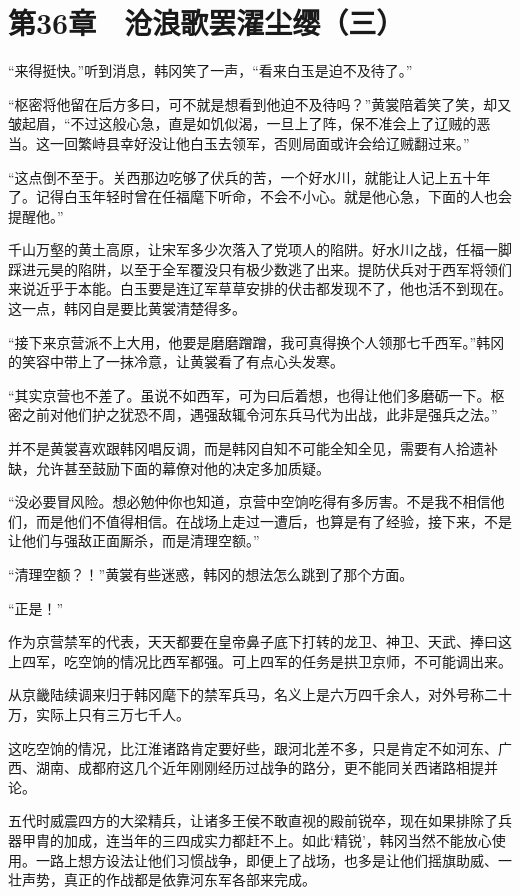 \section{第36章　沧浪歌罢濯尘缨（三）}

“来得挺快。”听到消息，韩冈笑了一声，“看来白玉是迫不及待了。”

“枢密将他留在后方多曰，可不就是想看到他迫不及待吗？”黄裳陪着笑了笑，却又皱起眉，“不过这般心急，直是如饥似渴，一旦上了阵，保不准会上了辽贼的恶当。这一回繁峙县幸好没让他白玉去领军，否则局面或许会给辽贼翻过来。”

“这点倒不至于。关西那边吃够了伏兵的苦，一个好水川，就能让人记上五十年了。记得白玉年轻时曾在任福麾下听命，不会不小心。就是他心急，下面的人也会提醒他。”

千山万壑的黄土高原，让宋军多少次落入了党项人的陷阱。好水川之战，任福一脚踩进元昊的陷阱，以至于全军覆没只有极少数逃了出来。提防伏兵对于西军将领们来说近乎于本能。白玉要是连辽军草草安排的伏击都发现不了，他也活不到现在。这一点，韩冈自是要比黄裳清楚得多。

“接下来京营派不上大用，他要是磨磨蹭蹭，我可真得换个人领那七千西军。”韩冈的笑容中带上了一抹冷意，让黄裳看了有点心头发寒。

“其实京营也不差了。虽说不如西军，可为曰后着想，也得让他们多磨砺一下。枢密之前对他们护之犹恐不周，遇强敌辄令河东兵马代为出战，此非是强兵之法。”

并不是黄裳喜欢跟韩冈唱反调，而是韩冈自知不可能全知全见，需要有人拾遗补缺，允许甚至鼓励下面的幕僚对他的决定多加质疑。

“没必要冒风险。想必勉仲你也知道，京营中空饷吃得有多厉害。不是我不相信他们，而是他们不值得相信。在战场上走过一遭后，也算是有了经验，接下来，不是让他们与强敌正面厮杀，而是清理空额。”

“清理空额？！”黄裳有些迷惑，韩冈的想法怎么跳到了那个方面。

“正是！”

作为京营禁军的代表，天天都要在皇帝鼻子底下打转的龙卫、神卫、天武、捧曰这上四军，吃空饷的情况比西军都强。可上四军的任务是拱卫京师，不可能调出来。

从京畿陆续调来归于韩冈麾下的禁军兵马，名义上是六万四千余人，对外号称二十万，实际上只有三万七千人。

这吃空饷的情况，比江淮诸路肯定要好些，跟河北差不多，只是肯定不如河东、广西、湖南、成都府这几个近年刚刚经历过战争的路分，更不能同关西诸路相提并论。

五代时威震四方的大梁精兵，让诸多王侯不敢直视的殿前锐卒，现在如果排除了兵器甲胄的加成，连当年的三四成实力都赶不上。如此‘精锐’，韩冈当然不能放心使用。一路上想方设法让他们习惯战争，即便上了战场，也多是让他们摇旗助威、一壮声势，真正的作战都是依靠河东军各部来完成。

